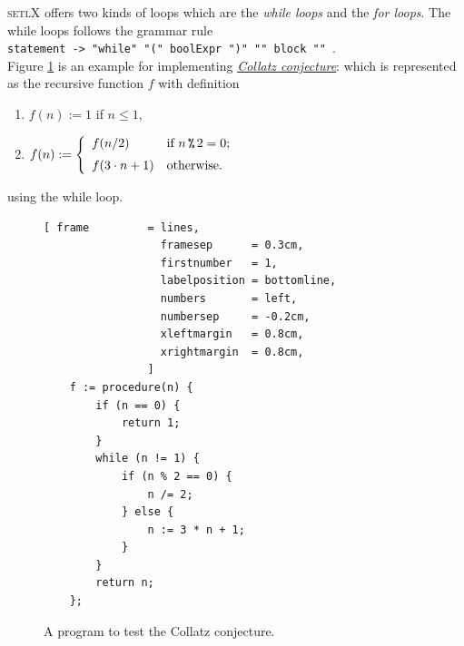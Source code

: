 \documentclass[11pt]{report}
\begin{document}
\textsc{setlX} offers two kinds of loops which are the \textsl{while loops} and the \textsl{for loops}. The while loops follows the grammar rule
\\[0.2cm]
\hspace*{1.3cm}
\texttt{statement -> "while" "(" boolExpr ")" "{" block "}" }.
\\[0.2cm]
Figure \ref{fig:ulam.stlx} is an example for implementing \href{http://en.wikipedia.org/wiki/Collatz_conjecture}{\emph{Collatz conjecture}}: which is represented as the recursive function $f$ with definition
\begin{enumerate}
\item $f(n) := 1$ \hspace*{2.13cm} if $n \leq 1$,
\item $f(n) := \left\{
       \begin{array}[c]{ll}
         f(n/2)           & \mbox{if $n \,\texttt{\symbol{37}}\, 2 = 0$;} \\[0.2cm]  
         f(3 \cdot n + 1) & \mbox{otherwise.} 
       \end{array}
       \right.
      $ 
\end{enumerate}
using the while loop.
\begin{figure}[!ht]
\centering
\begin{Verbatim}[ frame         = lines, 
                  framesep      = 0.3cm, 
                  firstnumber   = 1,
                  labelposition = bottomline,
                  numbers       = left,
                  numbersep     = -0.2cm,
                  xleftmargin   = 0.8cm,
                  xrightmargin  = 0.8cm,
                ]
    f := procedure(n) {
        if (n == 0) {
            return 1;   
        }
        while (n != 1) {
            if (n % 2 == 0) {
                n /= 2;
            } else {
                n := 3 * n + 1;
            }
        }
        return n;
    };
\end{Verbatim}
\vspace*{-0.3cm}
\caption{A program to test the Collatz conjecture.}
\label{fig:ulam.stlx}
\end{figure}
\end{document}
